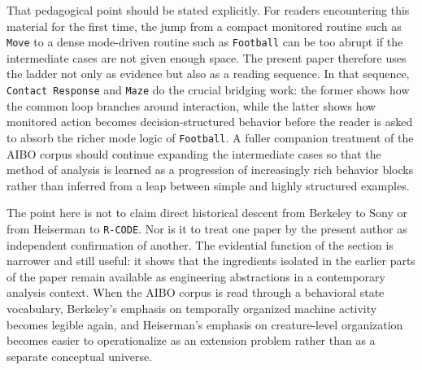 \documentclass[11pt]{article}
\begin{document}
That pedagogical point should be stated explicitly. For readers encountering this material for the first time, the jump from a compact monitored routine such as \texttt{Move} to a dense mode-driven routine such as \texttt{Football} can be too abrupt if the intermediate cases are not given enough space. The present paper therefore uses the ladder not only as evidence but also as a reading sequence. In that sequence, \texttt{Contact Response} and \texttt{Maze} do the crucial bridging work: the former shows how the common loop branches around interaction, while the latter shows how monitored action becomes decision-structured behavior before the reader is asked to absorb the richer mode logic of \texttt{Football}. A fuller companion treatment of the AIBO corpus should continue expanding the intermediate cases so that the method of analysis is learned as a progression of increasingly rich behavior blocks rather than inferred from a leap between simple and highly structured examples.

The point here is not to claim direct historical descent from Berkeley to Sony or from Heiserman to \texttt{R-CODE}. Nor is it to treat one paper by the present author as independent confirmation of another. The evidential function of the section is narrower and still useful: it shows that the ingredients isolated in the earlier parts of the paper remain available as engineering abstractions in a contemporary analysis context. When the AIBO corpus is read through a behavioral state vocabulary, Berkeley's emphasis on temporally organized machine activity becomes legible again, and Heiserman's emphasis on creature-level organization becomes easier to operationalize as an extension problem rather than as a separate conceptual universe.
\end{document}
